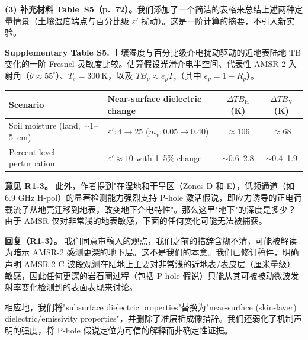 \documentclass[11pt]{article}
\newcommand{\revcomment}[1]{\begingroup\color{commentcolor}#1\endgroup}
\newcommand{\revresponse}[1]{\begingroup\color{responsecolor}#1\endgroup}
\begin{document}
{\medskip

\textbf{(3) 补充材料 Table~S5（p.~72）。}我们添加了一个简洁的表格来总结上述两种定量情景（土壤湿度端点与百分比级 $\varepsilon'$ 扰动）。这是一阶计算的摘要，不引入新实验。

\medskip

{\footnotesize
\textbf{Supplementary Table S5.} 土壤湿度与百分比级介电扰动驱动的近地表陆地 TB 变化的一阶 Fresnel 灵敏度比较。估算假设光滑介电半空间、代表性 AMSR-2 入射角（$\theta \approx 55^{\circ}$）、$T_s = 300~\mathrm{K}$，以及 $TB_p \approx e_p T_s$（其中 $e_p = 1 - R_p$）。

\medskip

\centering
\begin{tabular}{@{}llcc@{}}
\toprule
Scenario & Near-surface dielectric change & $\Delta TB_{\mathrm{H}}$ (K) & $\Delta TB_{\mathrm{V}}$ (K) \\
\midrule
Soil moisture (land, $\sim$1--5~cm) & $\varepsilon': 4 \rightarrow 25$ ($m_v: 0.05 \rightarrow 0.40$) & $\approx 106$ & $\approx 68$ \\
Percent-level perturbation & $\varepsilon' \approx 10$ with 1--5\% change & $\sim 0.6$--2.8 & $\sim 0.4$--1.9 \\
\bottomrule
\end{tabular}
\par
}
}

\bigskip

\revcomment{%
\textbf{意见 R1-3。}
此外，作者提到"在湿地和干旱区（Zones D 和 E），低频通道（如 6.9 GHz H-pol）的显著检测能力强烈支持 P-hole 激活假说，即应力诱导的正电荷载流子从地壳迁移到地表，改变地下介电特性"。那么这里"地下"的深度是多少？由于 AMSR 仅对非常浅的地表敏感，下面的任何变化可能无法被捕获。
}

\revresponse{%
\textbf{回复（R1-3）。}
我们同意审稿人的观点，我们之前的措辞含糊不清，可能被解读为暗示 AMSR-2 感测更深的地下层。这不是我们的本意。我们已修订稿件，明确声明 AMSR-2 C 波段观测在陆地上主要对非常浅的近地表/表皮层（厘米量级）敏感，因此任何更深的岩石圈过程（包括 P-hole 假说）只能从其可被被动微波发射率变化检测到的表面表现来讨论。

\medskip

相应地，我们将"subsurface dielectric properties"替换为"near-surface (skin-layer) dielectric/emissivity properties"，并删除了准层析成像措辞。我们还弱化了机制声明的强度，将 P-hole 假说定位为可信的解释而非确定性证据。
}
\end{document}
